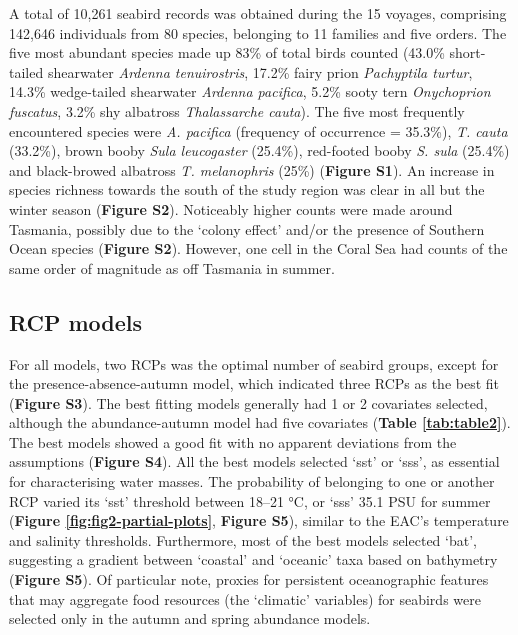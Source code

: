 \documentclass{article}
\begin{document}
A total of 10,261 seabird records was obtained during the 15 voyages, comprising 142,646 individuals from 80 species, belonging to 11 families and five orders. The five most abundant species made up 83\% of total birds counted (43.0\% short-tailed shearwater \emph{Ardenna tenuirostris}, 17.2\% fairy prion \emph{Pachyptila turtur}, 14.3\% wedge-tailed shearwater \emph{Ardenna pacifica}, 5.2\% sooty tern \emph{Onychoprion fuscatus}, 3.2\% shy albatross \emph{Thalassarche cauta}). The five most frequently encountered species were \emph{A. pacifica} (frequency of occurrence = 35.3\%), \emph{T. cauta} (33.2\%), brown booby \emph{Sula leucogaster} (25.4\%), red-footed booby \emph{S. sula} (25.4\%) and black-browed albatross \emph{T. melanophris} (25\%) (\textbf{Figure S1}). An increase in species richness towards the south of the study region was clear in all but the winter season (\textbf{Figure S2}). Noticeably higher counts were made around Tasmania, possibly due to the `colony effect' and/or the presence of Southern Ocean species (\textbf{Figure S2}). However, one cell in the Coral Sea had counts of the same order of magnitude as off Tasmania in summer.

\hypertarget{rcp-models}{%
\subsection{RCP models}\label{rcp-models}}

For all models, two RCPs was the optimal number of seabird groups, except for the presence-absence-autumn model, which indicated three RCPs as the best fit (\textbf{Figure S3}). The best fitting models generally had 1 or 2 covariates selected, although the abundance-autumn model had five covariates (\textbf{Table \ref{tab:table2}}). The best models showed a good fit with no apparent deviations from the assumptions (\textbf{Figure S4}). All the best models selected `sst' or `sss', as essential for characterising water masses. The probability of belonging to one or another RCP varied its `sst' threshold between 18--21 °C, or `sss' 35.1 PSU for summer (\textbf{Figure \ref{fig:fig2-partial-plots}}, \textbf{Figure S5}), similar to the EAC's temperature and salinity thresholds. Furthermore, most of the best models selected `bat', suggesting a gradient between `coastal' and `oceanic' taxa based on bathymetry (\textbf{Figure S5}). Of particular note, proxies for persistent oceanographic features that may aggregate food resources (the `climatic' variables) for seabirds were selected only in the autumn and spring abundance models.
\end{document}
